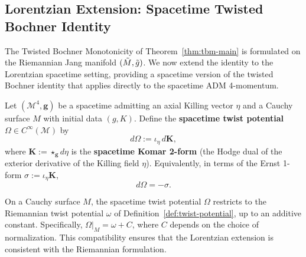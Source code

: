 \subsection{Lorentzian Extension: Spacetime Twisted Bochner Identity}

The Twisted Bochner Monotonicity of Theorem~\ref{thm:tbm-main} is formulated on the Riemannian Jang manifold $(\tilde{M}, \tilde{g})$. We now extend the identity to the Lorentzian spacetime setting, providing a spacetime version of the twisted Bochner identity that applies directly to the spacetime ADM 4-momentum.

\begin{definition}\label{def:spacetime-twist}
Let $(\mathcal{M}^4, \mathbf{g})$ be a spacetime admitting an axial Killing vector $\eta$ and a Cauchy surface $M$ with initial data $(g, K)$. Define the \textbf{spacetime twist potential} $\Omega \in C^\infty(\mathcal{M})$ by
\begin{equation}\label{eq:spacetime-twist-def}
d\Omega := \iota_\eta \, d\mathbf{K},
\end{equation}
where $\mathbf{K} := \star_{\mathbf{g}} d\eta$ is the \textbf{spacetime Komar 2-form} (the Hodge dual of the exterior derivative of the Killing field $\eta$). Equivalently, in terms of the Ernst 1-form $\sigma := \iota_\eta \mathbf{K}$,
\begin{equation}
d\Omega = -\sigma.
\end{equation}
\end{definition}

\begin{remark}
On a Cauchy surface $M$, the spacetime twist potential $\Omega$ restricts to the Riemannian twist potential $\omega$ of Definition~\ref{def:twist-potential}, up to an additive constant. Specifically, $\Omega|_M = \omega + C$, where $C$ depends on the choice of normalization. This compatibility ensures that the Lorentzian extension is consistent with the Riemannian formulation.
\end{remark}

